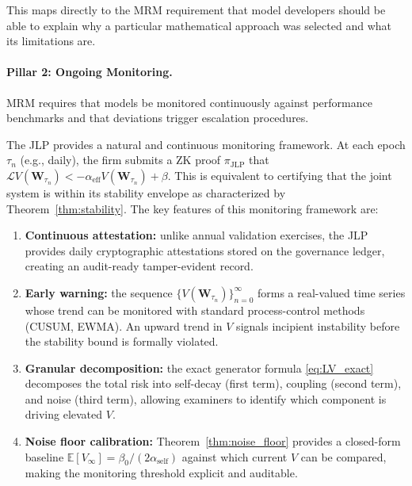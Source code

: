 \documentclass[12pt]{article}
\theoremstyle{plain}
\theoremstyle{definition}
\newcommand{\E}{\mathbb{E}}
\newcommand{\Lgen}{\mathcal{L}}
\newcommand{\W}{\mathbf{W}}
\begin{document}
This maps directly to the MRM requirement that model
developers should be able to explain why a particular
mathematical approach was selected and what its limitations are.

\paragraph{Pillar 2: Ongoing Monitoring.}

MRM requires that models be monitored continuously against
performance benchmarks and that deviations trigger escalation
procedures.  

The JLP provides a natural and continuous monitoring framework.
At each epoch $\tau_n$ (e.g., daily), the firm submits a ZK proof
$\pi_{\mathrm{JLP}}$ that
$\Lgen V(\W_{\tau_n}) < -\alpha_{\mathrm{eff}} V(\W_{\tau_n}) + \beta$.
This is equivalent to certifying that the joint system is within its
stability envelope as characterized by Theorem~\ref{thm:stability}.
The key features of this monitoring framework are:

\begin{enumerate}[label=(\roman*)]
  \item \textbf{Continuous attestation:} unlike annual validation
    exercises, the JLP provides daily cryptographic attestations stored
    on the governance ledger, creating an audit-ready tamper-evident
    record.

  \item \textbf{Early warning:} the sequence
    $\{V(\W_{\tau_n})\}_{n=0}^{\infty}$ forms a real-valued time series
    whose trend can be monitored with standard process-control methods
    (CUSUM, EWMA).  An upward trend in $V$ signals incipient
    instability before the stability bound is formally violated.

  \item \textbf{Granular decomposition:} the exact generator formula
    \eqref{eq:LV_exact} decomposes the total risk into self-decay
    (first term), coupling (second term), and noise (third term),
    allowing examiners to identify which component is driving elevated
    $V$.

  \item \textbf{Noise floor calibration:} Theorem~\ref{thm:noise_floor}
    provides a closed-form baseline $\E[V_\infty] = \beta_0/(2\alpha_{\mathrm{self}})$
    against which current $V$ can be compared, making the monitoring
    threshold explicit and auditable.
\end{enumerate}
\end{document}

